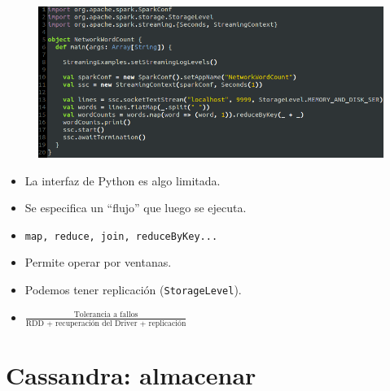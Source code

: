 \documentclass[dvipsnames]{beamer}
\begin{document}
        \begin{frame}
          \begin{figure}[H]
            \centering
            \includegraphics[scale=0.4]{img/script.png}
          \end{figure}
        \end{frame}

        \begin{frame}
          \begin{itemize}
          \item La interfaz de Python es algo limitada. 
          \item Se especifica un ``flujo'' que luego se ejecuta.
          \item \texttt{map, reduce, join, reduceByKey...}
          \item Permite operar por ventanas.
          \item Podemos tener \textcolor{deepRed}{replicación} (\texttt{StorageLevel}).
          \item $\frac{\text{Tolerancia a fallos}}{\text{RDD + recuperación del Driver + replicación}}$
          \end{itemize}
        \end{frame}
        
        \section{Cassandra: almacenar}
\end{document}
